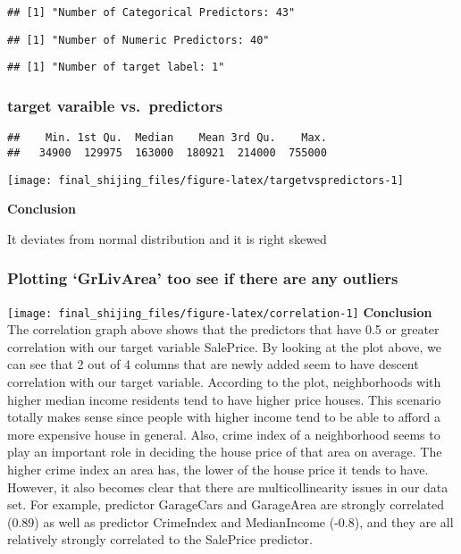 \documentclass[
]{article}
\begin{document}
\begin{verbatim}
## [1] "Number of Categorical Predictors: 43"
\end{verbatim}

\begin{verbatim}
## [1] "Number of Numeric Predictors: 40"
\end{verbatim}

\begin{verbatim}
## [1] "Number of target label: 1"
\end{verbatim}

\hypertarget{target-varaible-vs.-predictors}{%
\subsubsection{target varaible
vs.~predictors}\label{target-varaible-vs.-predictors}}

\begin{verbatim}
##    Min. 1st Qu.  Median    Mean 3rd Qu.    Max. 
##   34900  129975  163000  180921  214000  755000
\end{verbatim}

\texttt{[image: final\_shijing\_files/figure-latex/targetvspredictors-1]}

\textbf{Conclusion}

It deviates from normal distribution and it is right skewed

\hypertarget{plotting-grlivarea-too-see-if-there-are-any-outliers}{%
\subsubsection{Plotting `GrLivArea' too see if there are any
outliers}\label{plotting-grlivarea-too-see-if-there-are-any-outliers}}

\texttt{[image: final\_shijing\_files/figure-latex/correlation-1]}
\textbf{Conclusion} The correlation graph above shows that the
predictors that have 0.5 or greater correlation with our target variable
SalePrice. By looking at the plot above, we can see that 2 out of 4
columns that are newly added seem to have descent correlation with our
target variable. According to the plot, neighborhoods with higher median
income residents tend to have higher price houses. This scenario totally
makes sense since people with higher income tend to be able to afford a
more expensive house in general. Also, crime index of a neighborhood
seems to play an important role in deciding the house price of that area
on average. The higher crime index an area has, the lower of the house
price it tends to have. However, it also becomes clear that there are
multicollinearity issues in our data set. For example, predictor
GarageCars and GarageArea are strongly correlated (0.89) as well as
predictor CrimeIndex and MedianIncome (-0.8), and they are all
relatively strongly correlated to the SalePrice predictor.
\end{document}
